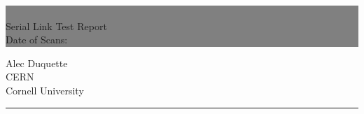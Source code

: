 \documentclass{report}
\begin{document}

\begin{titlepage} %
  
  
  \colorbox{grey}{
    \parbox[t]{0.93\textwidth}{ %
      \parbox[t]{0.91\textwidth}{ %
        \raggedleft %
        \fontsize{80pt}{40pt}\selectfont %
        \vspace{0.7cm} %

        \CM\\
        Serial Link Test Report\\
        Date of Scans: \dateofscans\\
        
        \vspace{0.7cm} %
        }
      }
    }

  \vfill %
  
  
  \parbox[t]{0.93\textwidth}{ %
    \raggedleft %
    \large %
    {\Large Alec Duquette}\\[4pt] %
    CERN\\
    Cornell University\\[4pt] %
    
    \hfill\rule{0.2\linewidth}{1pt}%
    }
  
\end{titlepage}

\hypertarget{MyToc}{}  %
\tableofcontents
\newpage
\end{document}
